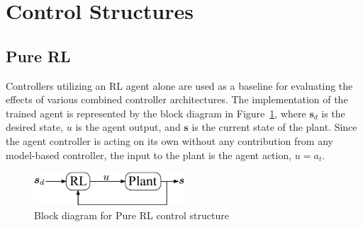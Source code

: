 \section{Control Structures}
\label{sec_chap2:control_structure}

\subsection{Pure RL}
Controllers utilizing an RL agent alone are used as a baseline for evaluating the effects of various combined controller architectures. 
%
The implementation of the trained agent is represented by the block diagram in Figure~\ref{fig_chap2:pure_RL_block_diagram}, where $\boldsymbol{s}_d$ is the desired state, $u$ is the agent output, and $\boldsymbol{s}$ is the current state of the plant. Since the agent controller is acting on its own without any contribution from any model-based controller, the input to the plant is the agent action, $u=a_t$.
%
\begin{figure}[tb]
\begin{center}
\includegraphics[width = 0.5\textwidth]{figures/figures_RL_model_based_control/Block_diagram_RL_alone.pdf}
\caption{Block diagram for Pure RL control structure} 
\label{fig_chap2:pure_RL_block_diagram}
\end{center}
\end{figure}
%

